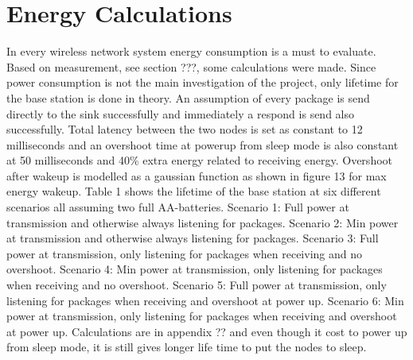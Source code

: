 \section{Energy Calculations}\label{sc:energyCalculations}

In every wireless network system energy consumption is a must to evaluate. Based on measurement, see section ???, some calculations were made. Since power consumption is not the main investigation of the project, only lifetime for the base station is done in theory. An assumption of every package is send directly to the sink successfully and immediately a respond is send also successfully. Total latency between the two nodes is set as constant to 12 milliseconds and an overshoot time at powerup from sleep mode is also constant at 50 milliseconds and 40\% extra energy related to receiving energy. Overshoot after wakeup is modelled as a gaussian function as shown in figure 13 for max energy wakeup. Table 1 shows the lifetime of the base station at six different scenarios all assuming two full AA-batteries.
Scenario 1: Full power at transmission and otherwise always listening for packages.
Scenario 2: Min power at transmission and otherwise always listening for packages.
Scenario 3: Full power at transmission, only listening for packages when receiving and no overshoot.
Scenario 4: Min power at transmission, only listening for packages when receiving and no overshoot.
Scenario 5: Full power at transmission, only listening for packages when receiving and overshoot at power up.
Scenario 6: Min power at transmission, only listening for packages when receiving and overshoot at power up.
Calculations are in appendix ?? and even though it cost to power up from sleep mode, it is still gives longer life time to put the nodes to sleep.


